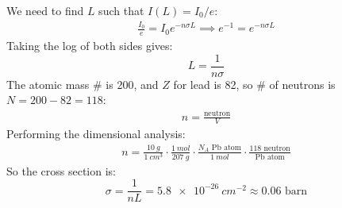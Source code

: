 \documentclass[12pt]{article}
\begin{document}
We need to find $L$ such that $I(L)=I_0/e$:
\begin{align*}
  \frac{I_0}{e}=I_0e^{-n\sigma L}\implies e^{-1}=e^{-n\sigma L}
\end{align*}
Taking the log of both sides gives:
\begin{equation}
  \label{eq:p1b}
  \boxed{L=\frac{1}{n\sigma}}
\end{equation}
The atomic mass \# is 200, and $Z$ for lead is 82, so \# of neutrons is $N=200-82=118$:
\begin{align*}
  n=\frac{\text{neutron}}{V}
\end{align*}
Performing the dimensional analysis:
\begin{align*}
  n=\frac{\SI{10}{g}}{\SI{1}{cm^3}}\cdot
  \frac{\SI{1}{mol}}{\SI{207}{g}}\cdot
  \frac{N_A\text{ Pb atom}}{\SI{1}{mol}}\cdot
  \frac{118\text{ neutron}}{\text{Pb atom}}
\end{align*}
So the cross section is:
\begin{equation}
  \label{eq:p1c}
  \boxed{\sigma=\frac1{nL}=\SI{5.8e-26}{cm^{-2}}\approx0.06\text{ barn}}
\end{equation}
\newpage
\end{document}
